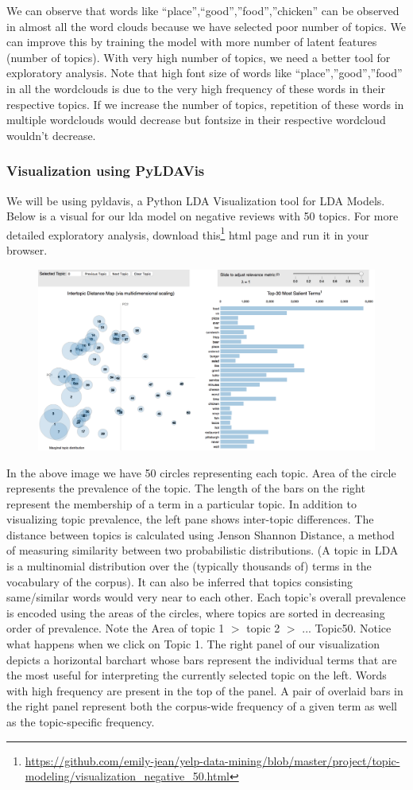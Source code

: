 \documentclass{neu_handout}
\begin{document}
We can observe that words like “place”,“good”,”food”,”chicken” can be observed in almost all the word clouds because we have selected poor number of topics. We can improve this by training the model with more number of latent features (number of topics). With very high number of topics, we need a better tool for exploratory analysis. 
Note that high font size of words like “place”,”good”,”food” in all the wordclouds is due to the very high frequency of these words in their respective topics. If we increase the number of topics, repetition of these words in multiple wordclouds would decrease but fontsize in their respective wordcloud wouldn’t decrease. 

\subsubsection*{Visualization using PyLDAVis}
We will be using pyldavis, a Python LDA Visualization tool for LDA Models. Below is a visual for our lda model on negative reviews with 50 topics. For more detailed exploratory analysis, download this\footnote{\url{https://github.com/emily-jean/yelp-data-mining/blob/master/project/topic-modeling/visualization_negative_50.html}} html page and run it in your browser.

\begin{figure}[h]
\centering
{
\includegraphics[width=0.4\linewidth]{first_image}
}
\end{figure}

In the above image we have 50 circles representing each topic. Area of the circle represents the prevalence of the topic. The length of the bars on the right represent the membership of a term in a particular topic. In addition to visualizing topic prevalence, the left pane shows inter-topic differences. The distance between topics is calculated using Jenson Shannon Distance, a method of measuring similarity between two probabilistic distributions. (A topic in LDA is a multinomial distribution over the (typically thousands of) terms in the vocabulary of the corpus). It can also be inferred that topics consisting same/similar words would very near to each other.
Each topic’s overall prevalence is encoded using the areas of the circles, where topics are sorted in decreasing order of prevalence. Note the Area of topic 1 $>$ topic 2 $>$ ... Topic50.
Notice what happens when we click on Topic 1. The right panel of our visualization depicts a horizontal barchart whose bars represent the individual terms that are the most useful for interpreting the currently selected topic on the left. Words with high frequency are present in the top of the panel. A pair of overlaid bars in the right panel represent both the corpus-wide frequency of a given term as well as the topic-specific frequency.
\end{document}

